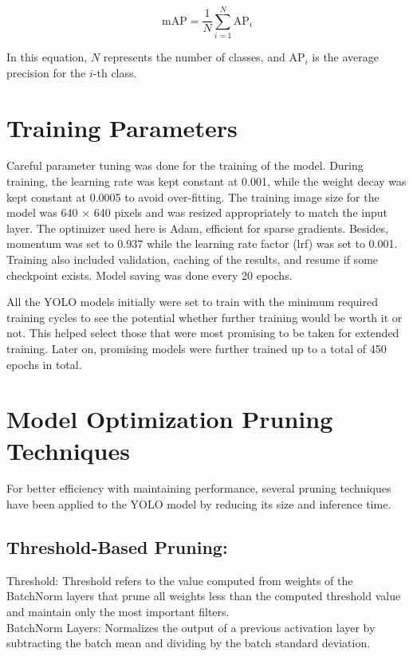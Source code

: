 \begin{equation}
\text{mAP} = \frac{1}{N} \sum_{i=1}^{N} \text{AP}_i
\end{equation}

In this equation, \(N\) represents the number of classes, and \(\text{AP}_i\) is the average precision for the \(i\)-th class.\cite{padilla2021comparative}


\section{Training Parameters}
Careful parameter tuning was done for the training of the model. During training, the learning rate was kept constant at 0.001, while the weight decay was kept constant at 0.0005 to avoid over-fitting. The training image size for the model was 640 × 640 pixels and was resized appropriately to match the input layer. The optimizer used here is Adam, efficient for sparse gradients. Besides, momentum was set to 0.937 while the learning rate factor (lrf) was set to 0.001. Training also included validation, caching of the results, and resume if some checkpoint exists. Model saving was done every 20 epochs.

All the YOLO models initially were set to train with the minimum required training cycles to see the potential whether further training would be worth it or not. This helped select those that were most promising to be taken for extended training. Later on, promising models were further trained up to a total of 450 epochs in total.


\section{Model Optimization
Pruning Techniques}\label{puringtech}

For better efficiency with maintaining performance, several pruning techniques have been applied to the YOLO model by reducing its size and inference time.

\subsection{Threshold-Based Pruning:}

Threshold: Threshold refers to the value computed from weights of the BatchNorm layers that prune all weights less than the computed threshold value and maintain only the most important filters.
\\
\noindent BatchNorm Layers: Normalizes the output of a previous activation layer by subtracting the batch mean and dividing by the batch standard deviation.

